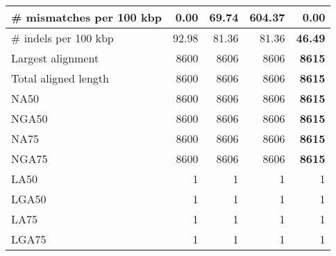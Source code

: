 \documentclass[12pt,a4paper]{article}
\begin{document}
\begin{table}[ht]
\begin{center}
\begin{tabular}{|l*{4}{|r}|}
\# mismatches per 100 kbp & {\bf 0.00} & 69.74 & 604.37 & {\bf 0.00} \\ \hline
\# indels per 100 kbp & 92.98 & 81.36 & 81.36 & {\bf 46.49} \\ \hline
Largest alignment & 8600 & 8606 & 8606 & {\bf 8615} \\ \hline
Total aligned length & 8600 & 8606 & 8606 & {\bf 8615} \\ \hline
NA50 & 8600 & 8606 & 8606 & {\bf 8615} \\ \hline
NGA50 & 8600 & 8606 & 8606 & {\bf 8615} \\ \hline
NA75 & 8600 & 8606 & 8606 & {\bf 8615} \\ \hline
NGA75 & 8600 & 8606 & 8606 & {\bf 8615} \\ \hline
LA50 & 1 & 1 & 1 & 1 \\ \hline
LGA50 & 1 & 1 & 1 & 1 \\ \hline
LA75 & 1 & 1 & 1 & 1 \\ \hline
LGA75 & 1 & 1 & 1 & 1 \\ \hline
\end{tabular}
\end{center}
\end{table}
\end{document}
